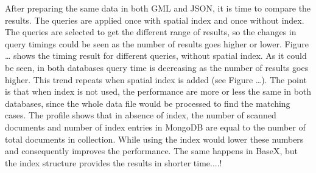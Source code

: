 After preparing the same data in both GML and JSON, it is time to compare the results. The queries are applied once with spatial index and once without index. The queries are selected to get the different range of results, so the changes in query timings could be seen as the number of results goes higher or lower. Figure … shows the timing result for different queries, without spatial index. 
As it could be seen, in both databases query time is decreasing as the number of results goes higher. This trend repeats when spatial index is added (see Figure …). The point is that when index is not used, the performance are more or less the same in both databases, since the whole data file would be processed to find the matching cases. The profile shows that in absence of index, the number of  scanned documents and number of index entries in MongoDB are equal to the number of total documents in collection. While using the index would lower these numbers and consequently improves the performance. The same happens in BaseX, but the index structure provides the results in shorter time....!






